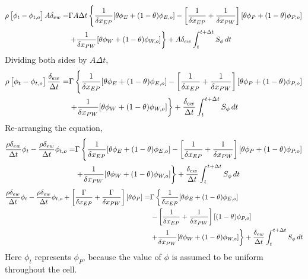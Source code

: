 \documentclass[a4paper, 12pt]{report}
\begin{document}
\begin{center}
\begin{equation*}
\begin{split}
\rho \left[\phi_{t} - \phi_{t,o}\right]A\delta_{ew} = & \Gamma A\Delta t\left\{\frac{1}{\delta x_{EP}}[\theta\phi_{E} + (1-\theta)\phi_{E,o}]  - \left[\frac{1}{\delta x_{EP}} + \frac{1}{\delta x_{PW}}\right][\theta\phi_{P} + (1-\theta)\phi_{P,o}]  \right.\\ & \left. + \frac{1}{\delta x_{PW}}[\theta\phi_{W} + (1-\theta)\phi_{W,o}]\right\} + A\delta_{ew}\int^{t+\Delta t}_{t} S_\phi\,dt
\end{split}
\end{equation*}
Dividing both sides by $A\Delta t$,
\begin{equation*}
\begin{split}
\rho \left[\phi_{t} - \phi_{t,o}\right]\frac{\delta_{ew}}{\Delta t} = & \Gamma \left\{\frac{1}{\delta x_{EP}}[\theta\phi_{E} + (1-\theta)\phi_{E,o}]  - \left[\frac{1}{\delta x_{EP}} + \frac{1}{\delta x_{PW}}\right][\theta\phi_{P} + (1-\theta)\phi_{P,o}]  \right.\\ & \left. + \frac{1}{\delta x_{PW}}[\theta\phi_{W} + (1-\theta)\phi_{W,o}]\right\} + \frac{\delta_{ew}}{\Delta t}\int^{t+\Delta t}_{t} S_\phi\,dt
\end{split}
\end{equation*}
Re-arranging the equation,
\begin{equation*}
\begin{split}
\frac{\rho\delta_{ew}}{\Delta t}\phi_{t} - \frac{\rho\delta_{ew}}{\Delta t}\phi_{t,o} = & \Gamma \left\{\frac{1}{\delta x_{EP}}[\theta\phi_{E} + (1-\theta)\phi_{E,o}] - \left[\frac{1}{\delta x_{EP}} + \frac{1}{\delta x_{PW}}\right][\theta\phi_{P} + (1-\theta)\phi_{P,o}]  \right.\\ & \left.  + \frac{1}{\delta x_{PW}}[\theta\phi_{W} + (1-\theta)\phi_{W,o}]\right\} + \frac{\delta_{ew}}{\Delta t}\int^{t+\Delta t}_{t} S_\phi\,dt
\end{split}
\end{equation*}
\begin{equation*}
\begin{split}
\frac{\rho\delta_{ew}}{\Delta t}\phi_{t} - \frac{\rho\delta_{ew}}{\Delta t}\phi_{t,o} + \left[\frac{\Gamma}{\delta x_{EP}} + \frac{\Gamma}{\delta x_{PW}}\right][\theta\phi_{P}] = & \Gamma \left\{\frac{1}{\delta x_{EP}}[\theta\phi_{E} + (1-\theta)\phi_{E,o}]  \right.\\ & \left. - \left[\frac{1}{\delta x_{EP}} + \frac{1}{\delta x_{PW}}\right][(1-\theta)\phi_{P,o}]  \right.\\ & \left. + \frac{1}{\delta x_{PW}}[\theta\phi_{W} + (1-\theta)\phi_{W,o}]\right\} + \frac{\delta_{ew}}{\Delta t}\int^{t+\Delta t}_{t} S_\phi\,dt
\end{split}
\end{equation*}
Here $\phi_{t}$ represents $\phi_{P}$, because the value of $\phi$ is assumed to be uniform throughout the cell.

\end{center}
\end{document}
